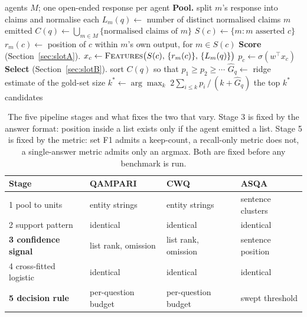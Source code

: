 \documentclass[11pt]{article}
\begin{document}
\begin{algorithm}[t]
\caption{Behavioural aggregation for one question $q$.}
\label{alg:beh}
\begin{algorithmic}[1]
\Require agents $M$; one open-ended response per agent
\Statex \textbf{Pool.}
  \State split $m$'s response into claims and normalise each
  \State $L_m(q) \gets$ number of distinct normalised claims $m$ emitted
\EndFor
\State $C(q) \gets \bigcup_{m \in M} \{\text{normalised claims of } m\}$
  \State $S(c) \gets \{m : m \text{ asserted } c\}$
  \State $r_m(c) \gets$ position of $c$ within $m$'s own output, for $m \in S(c)$
\EndFor
\Statex \textbf{Score} (Section~\ref{sec:slotA}).
  \State $x_c \gets \textsc{Features}\big(S(c),\, \{r_m(c)\},\, \{L_m(q)\}\big)$
  \State $p_c \gets \sigma(w^\top x_c)$ 
\EndFor
\Statex \textbf{Select} (Section~\ref{sec:slotB}).
\State sort $C(q)$ so that $p_1 \geq p_2 \geq \cdots$
\State $\hat{G}_q \gets$ ridge estimate of the gold-set size
\State $k^{*} \gets \arg\max_{k}\; 2\sum_{i \leq k} p_i \,/\, (k + \hat{G}_q)$
\State \Return the top $k^{*}$ candidates
\end{algorithmic}
\end{algorithm}

\begin{table}[t]
  \caption{The five pipeline stages and what fixes the two that vary. Stage 3 is fixed by the answer format: position inside a list exists only if the agent emitted a list. Stage 5 is fixed by the metric: set F1 admits a keep-count, a recall-only metric does not, a single-answer metric admits only an argmax. Both are fixed before any benchmark is run.}
  \label{tab:slots}
  \centering
  \begin{tabular}{llll}
    \toprule
    Stage & QAMPARI & CWQ & ASQA \\
    \midrule
    1 pool to units       & entity strings   & entity strings & sentence clusters  \\
    2 support pattern     & identical        & identical      & identical          \\
    \textbf{3 confidence signal} & list rank, omission & list rank, omission & sentence position \\
    4 cross-fitted logistic & identical      & identical      & identical          \\
    \textbf{5 decision rule}     & per-question budget & per-question budget & swept threshold \\
    \bottomrule
  \end{tabular}
\end{table}
\end{document}
